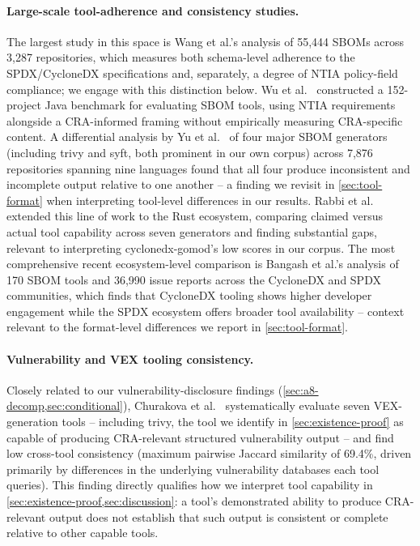 \documentclass[11pt]{article}
\begin{document}
\paragraph{Large-scale tool-adherence and consistency studies.} The largest study in this space is Wang et al.'s \cite{wang2026} analysis of 55,444 SBOMs across 3,287 repositories, which measures both schema-level adherence to the SPDX/CycloneDX specifications and, separately, a degree of NTIA policy-field compliance; we engage with this distinction below. Wu et al.\ \cite{wu2025} constructed a 152-project Java benchmark for evaluating SBOM tools, using NTIA requirements alongside a CRA-informed framing without empirically measuring CRA-specific content. A differential analysis by Yu et al.\ \cite{yu2024} of four major SBOM generators (including trivy and syft, both prominent in our own corpus) across 7,876 repositories spanning nine languages found that all four produce inconsistent and incomplete output relative to one another -- a finding we revisit in \cref{sec:tool-format} when interpreting tool-level differences in our results. Rabbi et al.\ \cite{rabbi2025} extended this line of work to the Rust ecosystem, comparing claimed versus actual tool capability across seven generators and finding substantial gaps, relevant to interpreting cyclonedx-gomod's low scores in our corpus. The most comprehensive recent ecosystem-level comparison is Bangash et al.'s \cite{bangash2026} analysis of 170 SBOM tools and 36,990 issue reports across the CycloneDX and SPDX communities, which finds that CycloneDX tooling shows higher developer engagement while the SPDX ecosystem offers broader tool availability -- context relevant to the format-level differences we report in \cref{sec:tool-format}.

\paragraph{Vulnerability and VEX tooling consistency.} Closely related to our vulnerability-disclosure findings (\cref{sec:a8-decomp,sec:conditional}), Churakova et al.\ \cite{churakova2025} systematically evaluate seven VEX-generation tools -- including trivy, the tool we identify in \cref{sec:existence-proof} as capable of producing CRA-relevant structured vulnerability output -- and find low cross-tool consistency (maximum pairwise Jaccard similarity of 69.4\%, driven primarily by differences in the underlying vulnerability databases each tool queries). This finding directly qualifies how we interpret tool capability in \cref{sec:existence-proof,sec:discussion}: a tool's demonstrated ability to produce CRA-relevant output does not establish that such output is consistent or complete relative to other capable tools.
\end{document}
